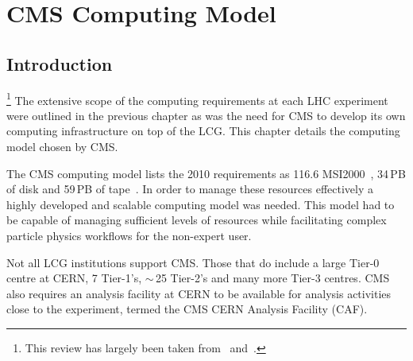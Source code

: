 \chapter{CMS Computing Model \label{sec:computing_model}}

\section{Introduction \label{sec:cms_computing_model:intro}}
\footnote{This review has largely been taken from~\cite{CMSNOTE_2004-031} and~\cite{CMS_TDR_PHYS_vol1}.} 
The extensive scope of the computing requirements at each LHC experiment were outlined in the previous chapter as was the need for CMS to develop its own computing infrastructure on top of the LCG. This chapter details the computing model chosen by CMS. 

The CMS computing model lists the 2010 requirements as 116.6 MSI2000~\cite{citeulike:847987}, 34\,PB of disk and 59\,PB of tape~\cite{CMSNOTE_2004-031}. In order to manage these resources effectively a highly developed and scalable computing model was needed. This model had to be capable of managing sufficient levels of resources while facilitating complex particle physics workflows for the non-expert user.


Not all LCG institutions support CMS. Those that do include a large Tier-0 centre at CERN, 7 Tier-1's, $\sim$\,25 Tier-2's and many more Tier-3 centres. CMS also requires an analysis facility at CERN to be available for analysis activities close to the experiment, termed the CMS CERN Analysis Facility (CAF).  



